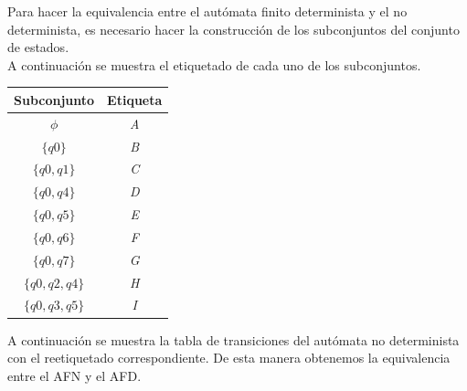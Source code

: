 \documentclass[12pt,letterpaper]{article}
\begin{document}
\justify
Para hacer la equivalencia entre el aut\'omata finito determinista y el no determinista, es necesario hacer la construcci\'on de los subconjuntos del conjunto de estados.\\
A continuaci\'on se muestra el etiquetado de cada uno de los subconjuntos.\\
\begin{center}
\begin{tabular}{| c | c |} \hline
Subconjunto & Etiqueta \\
\hline\hline
$\phi$ & \textit{A} \\
\hline
$\lbrace q0 \rbrace$ & \textit{B}  \\
\hline
$\lbrace q0, q1 \rbrace$ & \textit{C} \\
\hline
$\lbrace q0, q4 \rbrace$ & \textit{D} \\
\hline
$\lbrace q0, q5 \rbrace$ & \textit{E} \\
\hline
$\lbrace q0, q6 \rbrace$ & \textit{F} \\
\hline
$\lbrace q0, q7 \rbrace$ & \textit{G} \\
\hline
$\lbrace q0, q2, q4 \rbrace$ & \textit{H} \\
\hline
$\lbrace q0, q3, q5 \rbrace$ & \textit{I} \\
\hline
     
\end{tabular}
\end{center}
\newpage
A continuaci\'on se muestra la tabla de transiciones del aut\'omata no determinista con el reetiquetado correspondiente. De esta manera obtenemos la equivalencia entre el AFN y el AFD.\\
\end{document}

